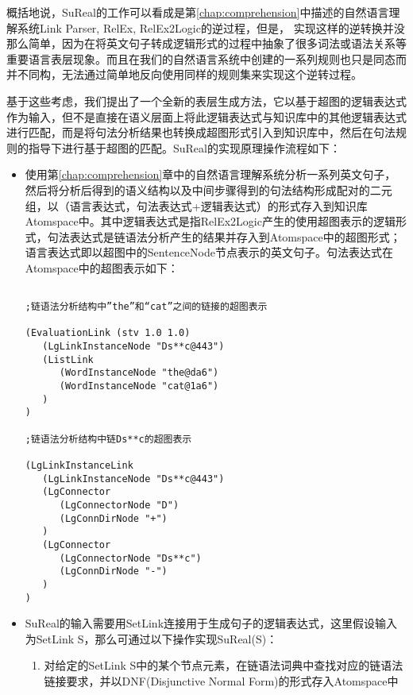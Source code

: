 概括地说，SuReal的工作可以看成是第\ref{chap:comprehension}中描述的自然语言理解系统Link Parser, RelEx, RelEx2Logic的逆过程，但是， 实现这样的逆转换并没那么简单，因为在将英文句子转成逻辑形式的过程中抽象了很多词法或语法关系等重要语言表层现象。而且在我们的自然语言系统中创建的一系列规则也只是同态而并不同构，无法通过简单地反向使用同样的规则集来实现这个逆转过程。

基于这些考虑，我们提出了一个全新的表层生成方法，它以基于超图的逻辑表达式作为输入，但不是直接在语义层面上将此逻辑表达式与知识库中的其他逻辑表达式进行匹配，而是将句法分析结果也转换成超图形式引入到知识库中，然后在句法规则的指导下进行基于超图的匹配。SuReal的实现原理操作流程如下：

\begin{itemize}
\item	使用第\ref{chap:comprehension}章中的自然语言理解系统分析一系列英文句子，然后将分析后得到的语义结构以及中间步骤得到的句法结构形成配对的二元组，以（语言表达式，句法表达式+逻辑表达式）的形式存入到知识库Atomspace中。其中逻辑表达式是指RelEx2Logic产生的使用超图表示的逻辑形式，句法表达式是链语法分析产生的结果并存入到Atomspace中的超图形式；语言表达式即以超图中的SentenceNode节点表示的英文句子。句法表达式在Atomspace中的超图表示如下：

\begin{verbatim}

;链语法分析结构中”the”和“cat”之间的链接的超图表示

(EvaluationLink (stv 1.0 1.0)
   (LgLinkInstanceNode "Ds**c@443")
   (ListLink
      (WordInstanceNode "the@da6")
      (WordInstanceNode "cat@1a6")
   )
)

;链语法分析结构中链Ds**c的超图表示

(LgLinkInstanceLink
   (LgLinkInstanceNode "Ds**c@443")
   (LgConnector
      (LgConnectorNode "D")
      (LgConnDirNode "+")
   )
   (LgConnector
      (LgConnectorNode "Ds**c")
      (LgConnDirNode "-")
   )
)

\end{verbatim}

\item	SuReal的输入需要用SetLink连接用于生成句子的逻辑表达式，这里假设输入为SetLink S，那么可通过以下操作实现SuReal(S)：

\begin{enumerate}

\item 对给定的SetLink S中的某个节点元素，在链语法词典中查找对应的链语法链接要求，并以DNF(Disjunctive Normal Form)的形式存入Atomspace中


\end{enumerate}
\end{itemize}
